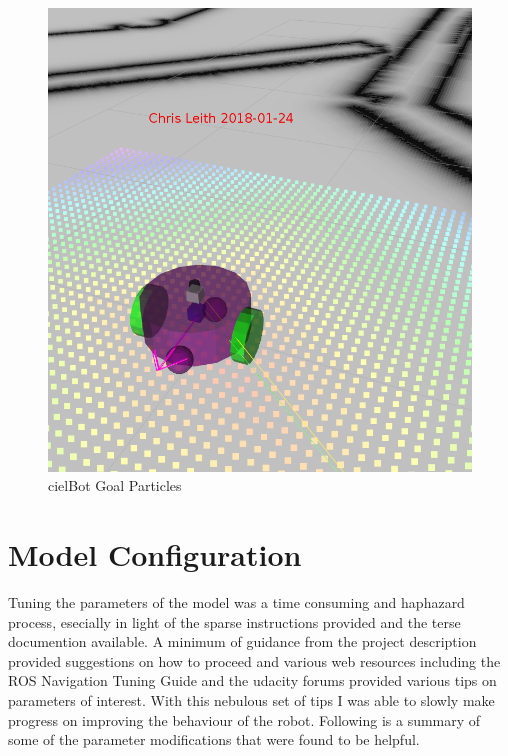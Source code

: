 \documentclass[10pt,journal,compsoc]{IEEEtran}
\begin{document}
\begin{figure}[h]
      \centering
      \includegraphics[width=\linewidth]{../Assets/writeupImages/cielBot_rvizGoal.png}
      \caption{cielBot Goal Particles }
      \label{fig:cielBot Goal Particles}
\end{figure}


\section{Model Configuration}
Tuning the parameters of the model was a time consuming and haphazard process, esecially in light of the sparse instructions provided and the terse documention available.
A minimum of guidance from the project description provided suggestions on how to proceed and various web resources including the ROS Navigation Tuning Guide and the udacity forums provided various tips on parameters of interest. With this nebulous set of tips I was able to slowly make progress on improving the behaviour of the robot. Following is a summary of some of the parameter modifications that were found to be helpful.
\end{document}

